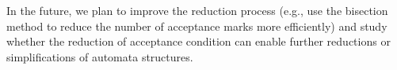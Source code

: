 \documentclass[a4paper,UKenglish,cleveref,autoref,thm-restate]{lipics-v2021}
\begin{document}
In the future, we plan to improve the reduction process (e.g., use the
bisection method to reduce the number of acceptance marks more
efficiently) and study whether the reduction of acceptance condition
can enable further reductions or simplifications of automata
structures.




%

\end{document}

